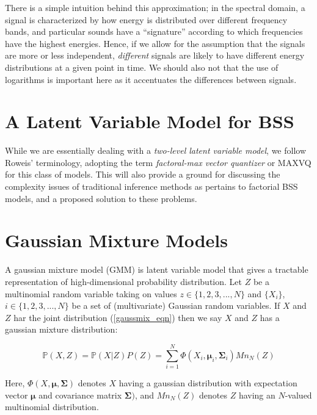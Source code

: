\documentclass[11pt, oneside, a4paper]{report}
\begin{document}
There is a simple intuition behind this approximation; in the spectral domain, a signal is characterized
by how energy is distributed over different frequency bands, and particular sounds have a ``signature''
according to which frequencies have the highest energies. Hence, if we allow for the assumption that
the signals are more or less independent, \emph{different} signals are likely to have different energy 
distributions at a given point in time. We should also not that the use of logarithms is important here as 
it accentuates the differences between signals.




\section{A Latent Variable Model for BSS}

While we are essentially dealing with a \emph{two-level latent variable model}, we follow
Roweis' terminology, adopting the term \emph{factoral-max vector quantizer} or MAXVQ for 
this class of models. This will also provide a ground for discussing the complexity issues
of traditional inference methods as pertains to factorial BSS models, and a proposed solution
to these problems.




\section{Gaussian Mixture Models}\label{gmm_appendix}
A gaussian mixture model (GMM) is latent variable model that gives a
tractable representation of high-dimensional probability
distribution. Let $Z$ be a multinomial random variable taking on
values $z \in \{1,2,3,...,N\}$ and $\{X_i\}$, $i \in \{1,2,3,...,N\}$
be a set of (multivariate) Gaussian random variables. If $X$ and $Z$
har the joint distribution (\ref{gaussmix_eqn}) then we say $X$ and $Z$
has a gaussian mixture distribution:

\begin{equation}\label{gaussmix_eqn}
  \mathbb{P}(X,Z) = \mathbb{P}(X|Z)P(Z) = \sum_{i = 1}^N
  \Phi(X_i,\mathbf{\mu}_i, \mathbf{\Sigma}_i)Mn_N(Z)
\end{equation}

Here, $\Phi(X,\mathbf{\mu}, \mathbf{\Sigma})$ denotes $X$ having a
gaussian distribution with expectation vector $\mathbf{\mu}$ and
covariance matrix $\mathbf{\Sigma})$, and $Mn_N(Z)$ denotes $Z$ having
an $N$-valued multinomial distribution.
\end{document}
